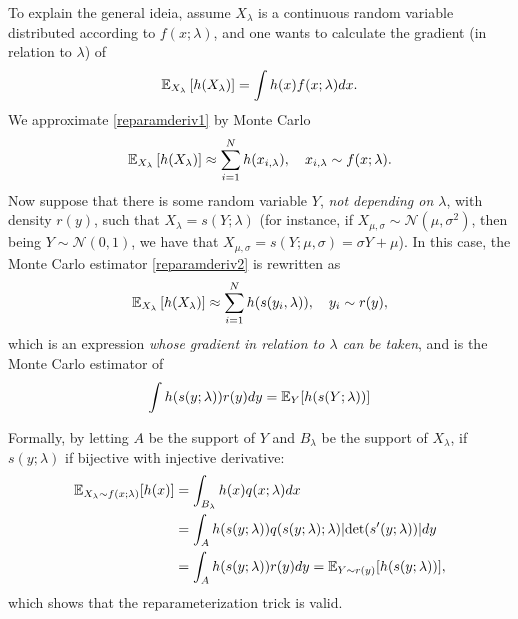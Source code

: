To explain the general ideia, assume $X_\lambda$ is a continuous random variable distributed according to $f(x;\lambda)$, and one wants to calculate the gradient (in relation to $\lambda$) of
\begin{equation}\label{reparamderiv1}
{\mathbb E}_{X_\lambda} \left[ h(X_\lambda) \right] = \int h(x) f(x;\lambda) dx.
\end{equation}
We approximate \eqref{reparamderiv1} by Monte Carlo
\begin{equation}\label{reparamderiv2}
{\mathbb E}_{X_\lambda} \left[ h(X_\lambda) \right] \approx \sum_{i=1}^N h(x_{i,\lambda}), \quad x_{i,\lambda} \sim f(x;\lambda).
\end{equation}
Now suppose that there is some random variable $Y$, \textit{not depending on $\lambda$}, with density $r(y)$, such that $X_\lambda = s(Y;\lambda)$ (for instance, if $X_{\mu,\sigma} \sim \mathcal{N}(\mu,\sigma^2)$, then being $Y \sim \mathcal{N}(0,1)$, we have that $X_{\mu,\sigma} = s(Y;\mu,\sigma) = \sigma Y + \mu$). In this case, the Monte Carlo estimator \eqref{reparamderiv2} is rewritten as
\begin{equation}
{\mathbb E}_{X_\lambda} \left[ h(X_\lambda) \right] \approx \sum_{i=1}^N h(s(y_i,\lambda)), \quad y_i \sim r(y),
\end{equation}
which is an expression \textit{whose gradient in relation to $\lambda$ can be taken}, and is the Monte Carlo estimator of
\begin{equation}
\int h(s(y;\lambda)) r(y) dy = {\mathbb E}_Y [h(s(Y;\lambda))]
\end{equation}

Formally, by letting $A$ be the support of $Y$ and $B_\lambda$ be the support of $X_\lambda$, if $s(y;\lambda)$ if bijective with injective derivative:
\begin{equation}
\begin{split}
{\mathbb E}_{X_\lambda \sim f(x;\lambda)} [h(x)] & = \int_{B_\lambda} h(x) q(x;\lambda) dx \\
& = \int_A h(s(y;\lambda)) q(s(y;\lambda);\lambda) |\text{det} (s'(y;\lambda))| dy \\
& = \int_A h(s(y;\lambda)) r(y) dy = {\mathbb E}_{Y \sim r(y)} [h(s(y;\lambda))],
\end{split}
\end{equation}
which shows that the reparameterization trick is valid.

